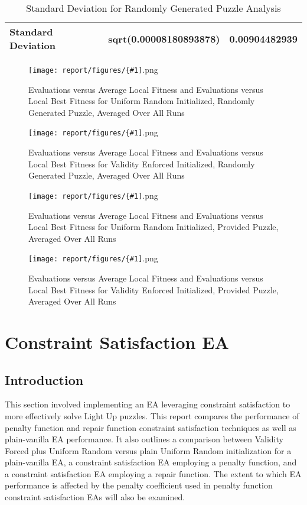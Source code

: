 \documentclass[11pt]{article}
\newcommand{\addgraphic}[1]{\centerline{\texttt{[image: report/figures/\{\#1]}.png}}}
\begin{document}
\begin{table}[H]
\centering
\caption{Standard Deviation for Randomly Generated Puzzle Analysis}
\label{bonus_table6}
\begin{tabular}{|l|l|l|}
\hline
Standard Deviation & sqrt(0.00008180893878) & 0.00904482939 \\ \hline
\end{tabular}
\end{table}


\begin{figure}[H]
    \addgraphic{random_gen_log_BONUS_graph}
    \caption{Evaluations versus Average Local Fitness and Evaluations versus Local Best Fitness for Uniform Random Initialized, Randomly Generated Puzzle, Averaged Over All Runs}
    \label{fig:std_rand_bonus}
\end{figure}

\begin{figure}[H]
    \addgraphic{random_gen_log_graph}
    \caption{Evaluations versus Average Local Fitness and Evaluations versus Local Best Fitness for Validity Enforced Initialized, Randomly Generated Puzzle, Averaged Over All Runs}
    \label{fig:std_rand_norm}
\end{figure}

\begin{figure}[H]
    \addgraphic{website_puzzle_log_BONUS_graph}
    \caption{Evaluations versus Average Local Fitness and Evaluations versus Local Best Fitness for Uniform Random Initialized, Provided Puzzle, Averaged Over All Runs}
    \label{fig:std_web_bonus}
\end{figure}

\begin{figure}[H]
    \addgraphic{website_puzzle_log_graph}
    \caption{Evaluations versus Average Local Fitness and Evaluations versus Local Best Fitness for Validity Enforced Initialized, Provided Puzzle, Averaged Over All Runs}
    \label{fig:std_web_norm}
\end{figure}


\section{Constraint Satisfaction EA}

\subsection{Introduction}

This section involved implementing an EA leveraging constraint satisfaction to
more effectively solve Light Up puzzles. This report compares the performance of
penalty function and repair function constraint satisfaction techniques as well as
plain-vanilla EA performance. It also outlines a comparison between Validity Forced plus 
Uniform Random versus plain Uniform Random initialization for a plain-vanilla EA,
a constraint satisfaction EA employing a penalty function, and a constraint satisfaction
EA employing a repair function. The extent to which EA performance is affected by 
the penalty coefficient used in penalty function constraint satisfaction EAs will also be examined.
\end{document}
